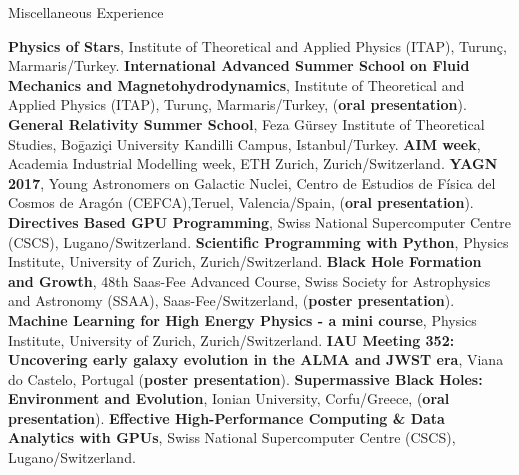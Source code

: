 \begin{rubric}{Miscellaneous Experience}
%

\entry*[17-29 July 2011] \textbf{Physics of Stars}, Institute of Theoretical and Applied Physics (\textsc{ITAP}), Turun\c{c}, Marmaris/Turkey.
%
\entry*[18-29 Sept. 2012] \textbf{International Advanced Summer School on Fluid Mechanics and Magnetohydrodynamics}, Institute of Theoretical and Applied Physics (ITAP), Turun\c{c}, Marmaris/Turkey, (\textbf{oral presentation}).
%
 \textbf{General Relativity Summer School}, Feza G\"{u}rsey Institute of Theoretical Studies, Bo\={g}azi\c{c}i University Kandilli Campus, Istanbul/Turkey.
%
\entry*[7-11 Nov. 2016] \textbf{AIM week}, Academia Industrial Modelling week, ETH Zurich, Zurich/Switzerland.
%
\entry*[23-25 Oct. 2017] \textbf{YAGN 2017}, Young Astronomers on Galactic Nuclei, Centro de Estudios de F\'{i}sica del Cosmos de Arag\'{o}n (CEFCA),Teruel, Valencia/Spain, (\textbf{oral presentation}).
%
\entry*[14-15 May 2018] \textbf{Directives Based GPU Programming}, Swiss National Supercomputer Centre (CSCS), Lugano/Switzerland.
%
\entry*[25-29 June 2018] \textbf{Scientific Programming with Python}, Physics Institute, University of Zurich, Zurich/Switzerland.
%
 \textbf{Black Hole Formation and Growth}, 48th Saas-Fee Advanced Course, Swiss Society for Astrophysics and Astronomy (SSAA), Saas-Fee/Switzerland, (\textbf{poster presentation}).
%
\entry*[4-5 Feb 2019] \textbf{Machine Learning for High Energy Physics - a mini course}, Physics Institute, University of Zurich, Zurich/Switzerland.
%
\entry*[3-7 June 2019] \textbf{IAU Meeting 352: Uncovering early galaxy evolution in the ALMA and JWST era}, Viana do Castelo, Portugal (\textbf{poster presentation}).
%
\entry*[19-22 June 2019] \textbf{Supermassive Black Holes: Environment and Evolution}, Ionian University, Corfu/Greece, (\textbf{oral presentation}).
%
\entry*[15-25 July 2019] \textbf{Effective High-Performance Computing \& Data Analytics with GPUs}, Swiss National Supercomputer Centre (CSCS), Lugano/Switzerland.

\end{rubric}